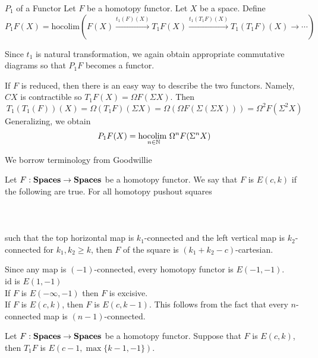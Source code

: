 \documentclass[a4paper]{article}
\begin{document}
\begin{defn}{$P_1$ of a Functor}{} Let $F$ be a homotopy functor. Let $X$ be a space. Define $$P_1F(X)=\text{hocolim}(F(X)\overset{t_1(F)(X)}{\rightarrow}T_1F(X)\overset{t_1(T_1F)(X)}{\rightarrow}T_1(T_1F)(X)\rightarrow\cdots)$$
\end{defn}

Since $t_1$ is natural transformation, we again obtain appropriate commutative diagrams so that $P_1F$ becomes a functor. 

\begin{eg}{}{} If $F$ is reduced, then there is an easy way to describe the two functors. Namely, $CX$ is contractible so $T_1F(X)=\Omega F(\Sigma X)$. Then $$T_1(T_1(F))(X)=\Omega (T_1F)(\Sigma X)=\Omega(\Omega F(\Sigma(\Sigma X)))=\Omega^2 F(\Sigma^2 X)$$ Generalizing, we obtain $$P_1F(X)=\underset{n\in\mathbb{N}}{\text{hocolim }}\Omega^n F(\Sigma^n X)$$
\end{eg}

We borrow terminology from Goodwillie

\begin{defn}{}{} Let $F:\bold{Spaces}\to\bold{Spaces}$ be a homotopy functor. We say that $F$ is $E(c,k)$ if the following are true. For all homotopy pushout squares \\~\\
\\~\\
such that the top horizontal map is $k_1$-connected and the left vertical map is $k_2$-connected for $k_1,k_2\geq k$, then $F$ of the square is $(k_1+k_2-c)$-cartesian. 
\end{defn}

Since any map is $(-1)$-connected, every homotopy functor is $E(-1,-1)$. \\
$\text{id}$ is $E(1,-1)$\\
If $F$ is $E(-\infty,-1)$ then $F$ is excisive. \\
If $F$ is $E(c,k)$, then $F$ is $E(c,k-1)$. This follows from the fact that every $n$-connected map is $(n-1)$-connected. 

\begin{prp}{}{} Let $F:\bold{Spaces}\to\bold{Spaces}$ be a homotopy functor. Suppose that $F$ is $E(c,k)$, then $T_1F$ is $E(c-1,\max\{k-1,-1\})$. 
\end{prp}
\end{document}
